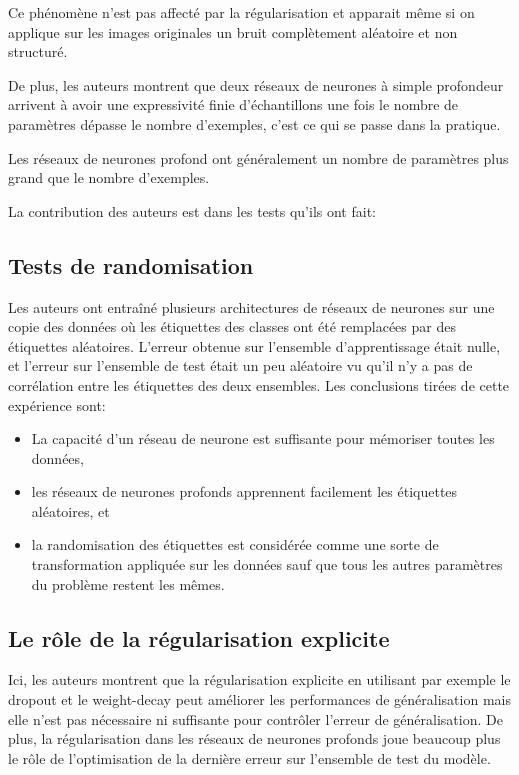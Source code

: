 \documentclass[a4paper,english,12pt, twocolumn]{article}
\begin{document}
Ce phénomène n'est pas affecté par la régularisation et apparait même si on applique sur les images originales un bruit complètement aléatoire et non structuré.

De plus, les auteurs montrent que deux réseaux de neurones à simple profondeur arrivent à avoir une expressivité finie d'échantillons une fois le nombre de paramètres dépasse le nombre d'exemples, c'est ce qui se passe dans la pratique.  

Les réseaux de neurones profond ont généralement un nombre de paramètres plus grand que le nombre d'exemples.

La contribution des auteurs est dans les tests qu'ils ont fait:

\subsection{Tests de randomisation}

Les auteurs ont entraîné plusieurs architectures de réseaux de neurones sur une copie des données où les étiquettes des classes ont été remplacées par des étiquettes aléatoires. L'erreur obtenue sur l'ensemble d'apprentissage était nulle, et l'erreur sur l'ensemble de test était un peu aléatoire vu qu'il n'y a pas de corrélation entre les étiquettes des deux ensembles. Les conclusions tirées de cette expérience sont:
\begin{itemize}
	\item La capacité d'un réseau de neurone est suffisante pour mémoriser toutes les données,
	\item les réseaux de neurones profonds apprennent facilement les étiquettes aléatoires, et
	\item la randomisation des étiquettes est considérée comme une sorte de transformation appliquée sur les données sauf que tous les autres paramètres du problème restent les mêmes.
\end{itemize}
\subsection{Le rôle de la régularisation explicite}
Ici, les auteurs montrent que la régularisation explicite en utilisant par exemple le dropout et le weight-decay peut améliorer les performances de généralisation mais elle n'est pas nécessaire ni suffisante pour contrôler l'erreur de généralisation. De plus, la régularisation dans les réseaux de neurones profonds joue beaucoup plus le rôle de l'optimisation de la dernière erreur sur l'ensemble de test du modèle.	
\end{document}
